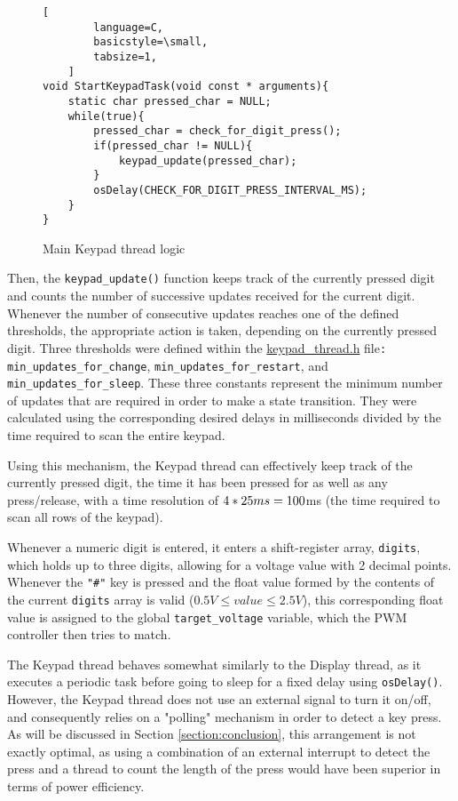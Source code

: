 \begin{figure}[h]
\begin{minipage}{0.45\textwidth}	
	\begin{lstlisting}[
		language=C,
		basicstyle=\small,
		tabsize=1,
	]
void StartKeypadTask(void const * arguments){
	static char pressed_char = NULL;
	while(true){
		pressed_char = check_for_digit_press();
		if(pressed_char != NULL){
			keypad_update(pressed_char);
		}
		osDelay(CHECK_FOR_DIGIT_PRESS_INTERVAL_MS);
	}
}
	\end{lstlisting}
	\caption{\label{fig:keypad-thread-main-logic}Main Keypad thread logic}
\end{minipage}
\end{figure}

Then, the \verb|keypad_update()| function keeps track of the currently pressed digit and counts the number of successive updates received for the current digit. Whenever the number of consecutive updates reaches one of the defined thresholds, the appropriate action is taken, depending on the currently pressed digit. Three thresholds were defined within the \href{https://github.com/lebrice/MicroP/blob/master/Lab4/Src/keypad_thread.h}{keypad\_thread.h} file\verb|:| \verb|min_updates_for_change|, \verb|min_updates_for_restart|, and \verb|min_updates_for_sleep|. These three constants represent the minimum number of updates that are required in order to make a state transition. They were calculated using the corresponding desired delays in milliseconds divided by the time required to scan the entire keypad. 

Using this mechanism, the Keypad thread can effectively keep track of the currently pressed digit, the time it has been pressed for as well as any press/release, with a time resolution of $4*25ms = 100$ms (the time required to scan all rows of the keypad).


Whenever a numeric digit is entered, it enters a shift-register array, \verb|digits|, which holds up to three digits, allowing for a voltage value with 2 decimal points. Whenever the \verb|"#"| key is pressed and the float value formed by the contents of the current \verb|digits| array is valid ($0.5V \leq value \leq  2.5V$), this corresponding float value is assigned to the global \verb|target_voltage| variable, which the PWM controller then tries to match.


The Keypad thread behaves somewhat similarly to the Display thread, as it executes a periodic task before going to sleep for a fixed delay using \verb|osDelay()|. However, the Keypad thread does not use an external signal to turn it on/off, and consequently relies on a "polling" mechanism in order to detect a key press. As will be discussed in Section \ref{section:conclusion}, this arrangement is not exactly optimal, as using a combination of an external interrupt to detect the press and a thread to count the length of the press would have been superior in terms of power efficiency.



